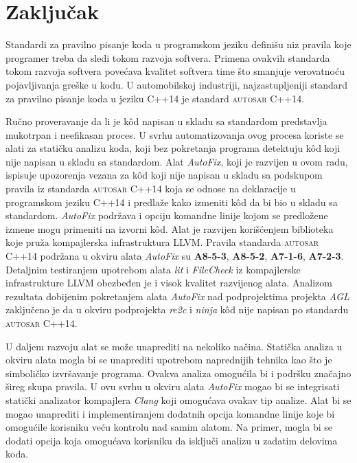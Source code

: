 \documentclass[12pt,oneside]{memoir}
\begin{document}

\chapter{Zaključak}

Standardi za pravilno pisanje koda u programskom jeziku defini\v{s}u niz pravila koje programer treba da sledi tokom razvoja softvera. Primena ovakvih standarda
tokom razvoja softvera pove\'{c}ava kvalitet softvera time \v{s}to smanjuje verovatno\'{c}u pojavljivanja gre\v{s}ke u kodu. U automobilskoj industriji,
najzastupljeniji standard za pravilno pisanje koda u jeziku C++14 je standard \textsc{autosar} C++14.
\par
Ru\v{c}no proveravanje da li je k\^{o}d napisan u skladu sa standardom predstavlja mukotrpan i neefikasan proces. U svrhu automatizovanja ovog procesa
koriste se alati za stati\v{c}ku analizu koda, koji bez pokretanja programa detektuju k\^{o}d koji nije napisan u skladu sa standardom. Alat \textit{AutoFix}, koji je razvijen u ovom radu, ispisuje upozorenja vezana za k\^{o}d koji nije napisan u skladu sa podskupom pravila iz standarda \textsc{autosar} C++14 koja se odnose na deklaracije u programskom jeziku C++14 i predla\v{z}e kako izmeniti k\^{o}d da bi bio u skladu sa standardom. \textit{AutoFix} podr\v{z}ava i opciju komandne linije kojom se predlo\v{z}ene izmene mogu primeniti na izvorni k\^{o}d. Alat je razvijen kori\v{s}\'{c}enjem biblioteka koje pru\v{z}a kompajlerska infrastruktura LLVM. Pravila standarda \textsc{autosar} C++14 podr\v{z}ana u okviru alata \textit{AutoFix} su \textbf{A8-5-3}, \textbf{A8-5-2}, \textbf{A7-1-6}, \textbf{A7-2-3}. Detaljnim testiranjem upotrebom alata \textit{lit} i \textit{FileCheck} iz kompajlerske infrastrukture LLVM obezbeđen je i visok kvalitet razvijenog alata. Analizom rezultata dobijenim pokretanjem alata \textit{AutoFix} nad podprojektima projekta \textit{AGL} zaklju\v{c}eno je da u okviru podprojekta \textit{re2c} i \textit{ninja} k\^{o}d nije napisan po standardu \textsc{autosar} C++14.

\par
U daljem razvoju alat se mo\v{z}e unaprediti na nekoliko na\v{c}ina. 
Stati\v{c}ka analiza u okviru alata mogla bi se unaprediti upotrebom naprednijih tehnika kao \v{s}to je simboli\v{c}ko izvr\v{s}avanje programa. Ovakva analiza
omogu\'{c}ila bi i podr\v{s}ku zna\v{c}ajno \v{s}ireg skupa pravila. U ovu svrhu u okviru alata \textit{AutoFix} mogao bi se integrisati stati\v{c}ki analizator kompajlera \textit{Clang} koji omogu\'{c}ava ovakav tip analize. Alat bi se mogao unaprediti i implementiranjem dodatnih opcija komandne linije koje bi omogu\'{c}ile korisniku ve\'{c}u
kontrolu nad samim alatom. Na primer, mogla bi se dodati opcija koja omogu\'{c}ava korisniku da isklju\v{c}i analizu u zadatim delovima koda.
\end{document}
